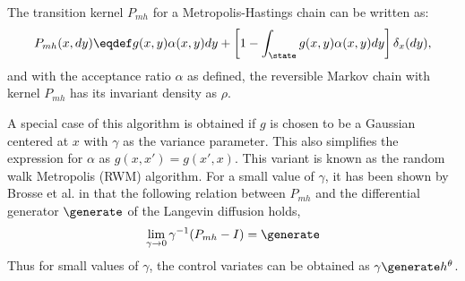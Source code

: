 The transition kernel $P_{mh}$ for a Metropolis-Hastings chain can be written as:
\begin{equation}
P_{mh}(x,dy) \eqdef g(x,y) \alpha(x,y) dy + \left [ 1 - \int_{\state} g(x,y) \alpha(x,y) dy \right] \delta_x (dy),
\label{e:kernel_mh}
\end{equation}
and with the acceptance ratio $\alpha$ as defined, the reversible Markov chain with kernel $P_{mh}$ has its invariant density as $\rho$.

A special case of this algorithm is obtained if $g$ is chosen to be a Gaussian centered at $x$ with $\gamma$ as the variance parameter. This also simplifies the expression for $\alpha$ as $g(x,x') = g(x',x)$. This variant is known as the random walk Metropolis (RWM) algorithm. For a small value of $\gamma$, it has been shown by Brosse et al. in \cite{brodurmeymourad18} that the following relation between $P_{mh}$ and the differential generator $\generate$ of the Langevin diffusion holds,
\[
\lim_{\gamma \to 0} \gamma^{-1} (P_{mh} - I) = \generate
\]
Thus for small values of $\gamma$, the control variates can be obtained as $\gamma \generate h^\theta$.  

